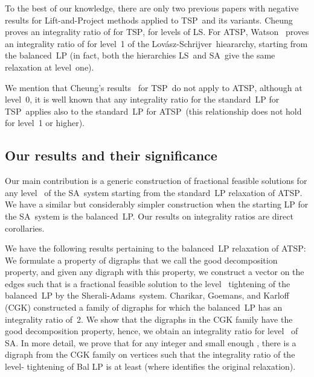 \documentclass[11pt]{article}
\newcommand{\sa}{\textsf{Sherali-Adams}}
\newcommand{\ls}{\textsf{Lov\'asz-Schrijver}}
\newcommand{\iLS}{\textsf{LS}}
\newcommand{\iLSp}{\textsf{LS}}
\newcommand{\iSA}{\textsf{SA}}
\newcommand{\tsp}{\textsc{TSP}}
\newcommand{\atsp}{\textsc{ATSP}}
\begin{document}
To the best of our knowledge, there are only two previous papers with
negative results for Lift-and-Project methods applied to \tsp\ and its
variants.
Cheung~\cite{cheung05} proves an integrality ratio of
 for \tsp, for  levels of \iLSp.
For \atsp, Watson~\cite{watson11} proves an integrality ratio of
 for level~1 of the \ls\ hieararchy, starting from the
balanced~LP (in fact, both the hierarchies \iLS\ and \iSA\ give the
same relaxation at level~one).

We mention that Cheung's results~\cite{cheung05}
for \tsp\ do not apply to \atsp, although
at level~0, it is well known that
any integrality ratio for the standard~LP for \tsp\
applies also to the standard~LP for \atsp\ 
(this relationship does not hold for level~1 or higher).



\subsection{Our results and their significance}


Our main contribution
is a generic construction of
fractional feasible solutions
for any level~ of the \iSA\ system starting from
the standard~LP relaxation of \atsp.
We have a similar but considerably simpler construction
when the starting LP for the \iSA\ system
is the balanced~LP.
Our results on integrality ratios are direct corollaries.


We have the following results pertaining to
the balanced~LP relaxation of \atsp:
We formulate a property of digraphs that we call
the good decomposition property, and
given any digraph with this property,
we construct a vector  on the edges such that
 is a fractional feasible solution to
the level~ tightening of the balanced~LP by the \sa\ system.
Charikar, Goemans, and Karloff (CGK) \cite{CGK06}
constructed a family of digraphs for which
the balanced~LP has an integrality ratio of~2.
We show that the digraphs in the CGK family
have the good decomposition property,
hence, we obtain an integrality ratio for level~ of \iSA.
In more detail,
we prove that for any integer  and small enough ,
there is a digraph  from the CGK family
on 
vertices such that the integrality ratio of the level- tightening of
Bal LP is at least
 (where  identifies the original relaxation). 
\end{document}
